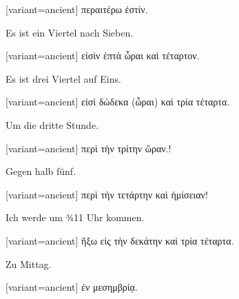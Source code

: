 \begin{greek}[variant=ancient]%
περαιτέρω ἐστίν.

\end{greek}%
\switchcolumn*

Es ist ein Viertel nach Sieben.

\switchcolumn

\begin{greek}[variant=ancient]%
εἰσὶν ἑπτὰ ὦραι καὶ τέταρτον.

\end{greek}%
\switchcolumn*

Es ist drei Viertel auf Eins.

\switchcolumn

\begin{greek}[variant=ancient]%
εἰσὶ δώδεκα (ὦραι) καὶ τρία τέταρτα.

\end{greek}%
\switchcolumn*

Um die dritte Stunde.

\switchcolumn

\begin{greek}[variant=ancient]%
περὶ τὴν τρίτην ὥραν.!

\end{greek}%
\switchcolumn*

Gegen halb fünf.

\switchcolumn

\begin{greek}[variant=ancient]%
περὶ τὴν τετάρτην καὶ ἡμίσειαν!

\end{greek}%
\switchcolumn*

Ich werde um ¾11 Uhr kommen.

\switchcolumn

\begin{greek}[variant=ancient]%
ἥξω εἰς τὴν δεκάτην καὶ τρία τέταρτα.

\end{greek}%
\indent Zu Mittag.

\switchcolumn

\begin{greek}[variant=ancient]%
ἐν μεσημβρίᾳ.

\end{greek}%
\switchcolumn*

